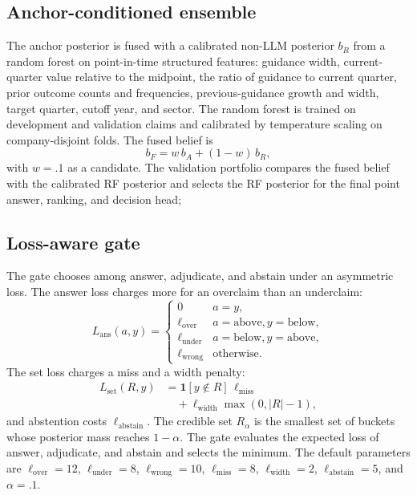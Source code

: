 \documentclass[11pt]{article}
\newcommand{\indic}{\mathbf{1}}
\begin{document}
\subsection{Anchor-conditioned ensemble}
The anchor posterior is fused with a calibrated non-LLM posterior $b_R$ from a random forest on point-in-time structured features: guidance width, current-quarter value relative to the midpoint, the ratio of guidance to current quarter, prior outcome counts and frequencies, previous-guidance growth and width, target quarter, cutoff year, and sector. The random forest is trained on development and validation claims and calibrated by temperature scaling on company-disjoint folds. The fused belief is
\begin{equation}
b_F=w\,b_A+(1-w)\,b_R,
\end{equation}
with $w=.1$ as a candidate. The validation portfolio compares the fused belief with the calibrated RF posterior and selects the RF posterior for the final point answer, ranking, and decision head;

\subsection{Loss-aware gate}
The gate chooses among answer, adjudicate, and abstain under an asymmetric loss. The answer loss charges more for an overclaim than an underclaim:
\begin{equation}
L_{\text{ans}}(a,y)=
\begin{cases}
0 & a=y,\\
\ell_{\text{over}} & a=\text{above}, y=\text{below},\\
\ell_{\text{under}} & a=\text{below}, y=\text{above},\\
\ell_{\text{wrong}} & \text{otherwise}.
\end{cases}
\end{equation}
The set loss charges a miss and a width penalty:
\begin{equation}
\begin{aligned}
L_{\text{set}}(R,y)&=\indic[y\notin R]\,\ell_{\text{miss}}\\
&\quad+\ell_{\text{width}}\max(0,|R|-1),
\end{aligned}
\end{equation}
and abstention costs $\ell_{\text{abstain}}$. The credible set $R_\alpha$ is the smallest set of buckets whose posterior mass reaches $1-\alpha$. The gate evaluates the expected loss of answer, adjudicate, and abstain and selects the minimum. The default parameters are $\ell_{\text{over}}=12$, $\ell_{\text{under}}=8$, $\ell_{\text{wrong}}=10$, $\ell_{\text{miss}}=8$, $\ell_{\text{width}}=2$, $\ell_{\text{abstain}}=5$, and $\alpha=.1$.
\end{document}
